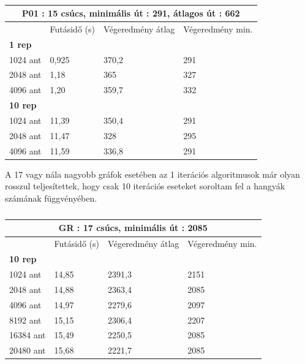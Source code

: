\begin{table}[ht!]
	\centering
	\begin{tabular}{|p{2cm}||p{3cm}|p{3.5cm}|p{3.5cm}|}
		\hline
		\multicolumn{4}{|c|}{P01 : 15 csúcs, minimális út : 291, átlagos út : 662} \\
		\hline
		& Futásidő (s) & Végeredmény átlag & Végeredmény min.\\
		\hline
		\textbf{1 rep} & & &\\
		1024 ant & 0,925 & 370,2 & 291\\
		2048 ant & 1,18 & 365 & 327\\
		4096 ant & 1,20 & 359,7 & 332\\
		\hline
		\textbf{10 rep} & & &\\
		1024 ant & 11,39 & 350,4 & 291\\
		2048 ant & 11,47 & 328 & 295\\
		4096 ant & 11,59 & 336,8 & 291\\
		\hline
	\end{tabular}
	\caption{}
	\label{table:TSPv1_15}
\end{table}

A 17 vagy nála nagyobb gráfok esetében az 1 iterációs algoritmusok már olyan rosszul teljesítettek, hogy csak 10 iterációs eseteket soroltam fel a hangyák számának függvényében.

\begin{table}[ht!]
	\centering
	\begin{tabular}{|p{2cm}||p{3cm}|p{3.5cm}|p{3.5cm}|}
		\hline
		\multicolumn{4}{|c|}{GR : 17 csúcs, minimális út : 2085} \\
		\hline
		& Futásidő (s) & Végeredmény átlag & Végeredmény min.\\
		\hline
		\textbf{10 rep} & & & \\
		1024 ant & 14,85 & 2391,3 & 2151\\
		2048 ant & 14,88 & 2363,4 & 2085\\
		4096 ant & 14,97 & 2279,6 & 2097\\
		8192 ant & 15,15 & 2306,4 & 2207\\
		16384 ant & 15,49 & 2250,5 & 2085\\
		20480 ant & 15,68 & 2221,7 & 2085 \\
		\hline
	\end{tabular}
	\caption{}
	\label{table:TSPv1_17}
\end{table}

